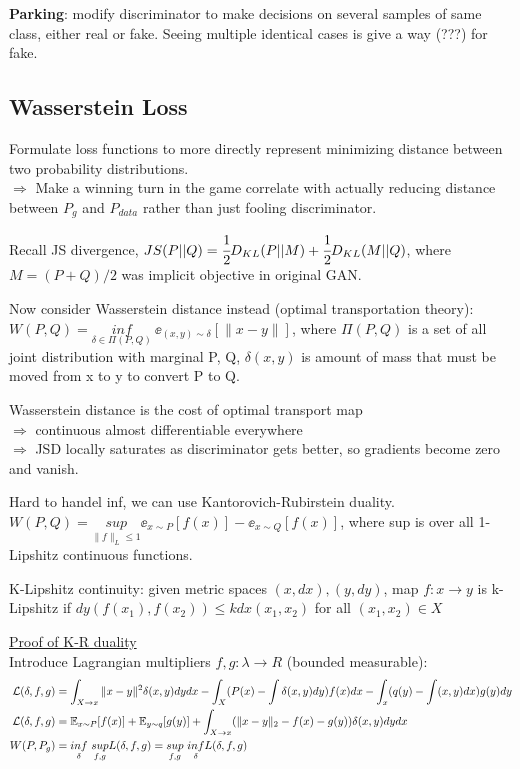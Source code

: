 \documentclass[12pt,a4paper]{article}
\begin{document}
\textbf{Parking}: modify discriminator to make decisions on several samples of same class, either real or fake. Seeing multiple identical cases is give a way (???) for fake.


\subsection{Wasserstein Loss}
Formulate loss functions to more directly represent minimizing distance between two probability distributions.\\
$\Rightarrow$ Make a winning turn in the game correlate with actually reducing distance between $P_g$ and $P_{data}$ rather than just fooling discriminator. 

Recall JS divergence, $JS(P||Q)=\cfrac{1}{2}D_{KL}(P||M)+\cfrac{1}{2}D_{KL}(M||Q)$, where $M=(P+Q)/2$ was implicit objective in original GAN. 

Now consider Wasserstein distance instead (optimal transportation theory):\\
$W(P,Q)=\underset{\delta\in \Pi(P,Q)}{inf}\ \ee_{(x,y)\sim \delta}[\|x-y\|]$, where $\Pi(P,Q)$ is a set of all joint distribution with marginal P, Q, $\delta(x,y)$ is amount of mass that must be moved from x to y to convert P to Q. 

Wasserstein distance is the cost of optimal transport map\\
$\Rightarrow$ continuous almost differentiable everywhere\\
$\Rightarrow$ JSD locally saturates as discriminator gets better, so gradients become zero and vanish. 

\vspace{0.5cm}
Hard to handel inf, we can use Kantorovich-Rubirstein duality.\\
$W(P,Q)=\underset{\|f\|_L\le 1}{sup} \ee_{x\sim P}[f(x)]-\ee_{x\sim Q}[f(x)]$, where sup is over all 1-Lipshitz continuous functions. 

K-Lipshitz continuity: given metric spaces $(x,dx), (y,dy)$, map $f: x\rightarrow y$ is k-Lipshitz if $dy(f(x_1), f(x_2))\le k dx(x_1, x_2)$ for all $(x_1, x_2)\in X$


\vspace{0.5cm}
\underline{Proof of K-R duality}\\
Introduce Lagrangian multipliers $f,g: \lambda\rightarrow R$ (bounded measurable):\\ 
\begin{equation}
    \begin{split}
\mathcal{L}(\delta, f,g)& =\int_{X\rightarrow x} \|x-y\|^2 \delta(x,y)dydx-\int_X(P(x)-\int \delta(x,y)dy)f(x)dx-\int_x(q(y)-\int(x,y)dx)g(y)dy\\
\mathcal{L}(\delta, f, g) &= \mathbb{E}_{x\sim P}[f(x)]+\mathbb{E}_{y\sim q}[g(y)] +\int_{X\rightarrow x} (\|x-y\|_2-f(x)-g(y)) \delta(x,y) dydx \\
W(P, P_g) &=\underset{\delta}{inf}\ \underset{f,g}{sup} L(\delta,f,g) = \underset{f,g}{sup}\ \underset{\delta}{inf} L(\delta, f,g)
    \end{split}
\end{equation}
\end{document}
